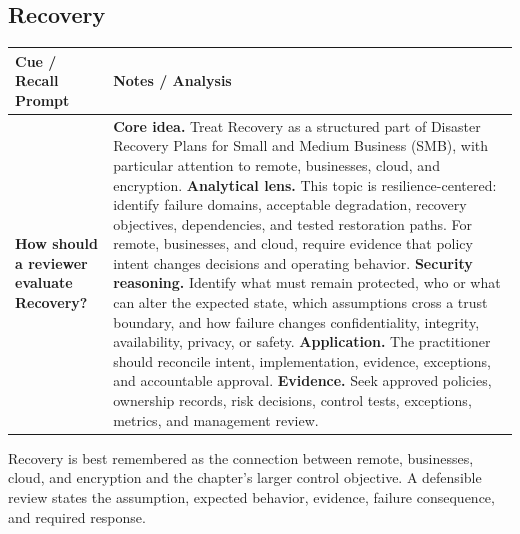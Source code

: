 \documentclass[11pt]{article}
\newcommand{\CornellHeader}{%
\rowcolor{Navy}\color{white}\bfseries Cue / Recall Prompt & \color{white}\bfseries Notes / Analysis\\\hline}
\newcommand{\CornellRow}[2]{%
\cellcolor{CueGray}\RaggedRight\textbf{#1} & \RaggedRight #2\\\hline}
\begin{document}
\subsection*{Recovery}
\begin{longtable}{>{\RaggedRight\arraybackslash}p{}|>{\RaggedRight\arraybackslash}p{}}
\CornellHeader
\CornellRow{How should a reviewer evaluate Recovery?}{\textbf{Core idea.} Treat Recovery as a structured part of Disaster Recovery Plans for Small and Medium Business (SMB), with particular attention to remote, businesses, cloud, and encryption. \textbf{Analytical lens.} This topic is resilience-centered: identify failure domains, acceptable degradation, recovery objectives, dependencies, and tested restoration paths. For remote, businesses, and cloud, require evidence that policy intent changes decisions and operating behavior. \textbf{Security reasoning.} Identify what must remain protected, who or what can alter the expected state, which assumptions cross a trust boundary, and how failure changes confidentiality, integrity, availability, privacy, or safety. \textbf{Application.} The practitioner should reconcile intent, implementation, evidence, exceptions, and accountable approval. \textbf{Evidence.} Seek approved policies, ownership records, risk decisions, control tests, exceptions, metrics, and management review.}
\end{longtable}
\begin{topicsummary}
Recovery is best remembered as the connection between remote, businesses, cloud, and encryption and the chapter's larger control objective. A defensible review states the assumption, expected behavior, evidence, failure consequence, and required response.
\end{topicsummary}
\end{document}
